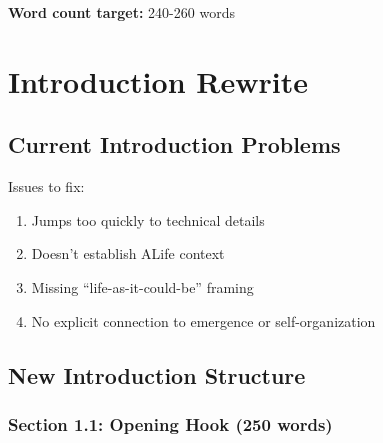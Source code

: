 \documentclass[11pt]{article}
\begin{document}
\textbf{Word count target:} 240-260 words

\section{Introduction Rewrite} \label{sec:intro}

\subsection{Current Introduction Problems}

\textcolor{edit}{Issues to fix:}
\begin{enumerate}
    \item Jumps too quickly to technical details
    \item Doesn't establish ALife context
    \item Missing ``life-as-it-could-be'' framing
    \item No explicit connection to emergence or self-organization
\end{enumerate}

\subsection{New Introduction Structure}

\subsubsection{Section 1.1: Opening Hook (250 words)}
\end{document}
